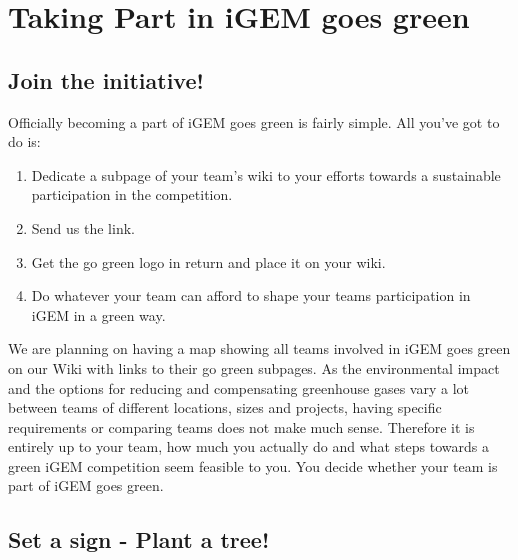
\chapter{Taking Part in iGEM goes green}\label{chap:takingpart}

\section{Join the initiative!}
Officially becoming a part of iGEM goes green is fairly simple. All you've got to do is:
\begin{enumerate}
	\item Dedicate a subpage of your team's wiki to your efforts towards a sustainable participation in the competition. 
	\item Send us the link.
	\item Get the go green logo in return and place it on your wiki.
	\item Do whatever your team can afford to shape your teams participation in iGEM in a green way.
	
\end{enumerate}
We are planning on having a map showing all teams involved in iGEM goes green on our Wiki with links to their go green subpages. As the environmental impact and the options for reducing and compensating greenhouse gases vary a lot between teams of different locations, sizes and projects, having specific requirements or comparing teams does not make much sense. Therefore it is entirely up to your team, how much you actually do and what steps towards a green iGEM competition seem feasible to you. You decide whether your team is part of iGEM goes green.


\section{Set a sign - Plant a tree!}\label{sec:trees}

